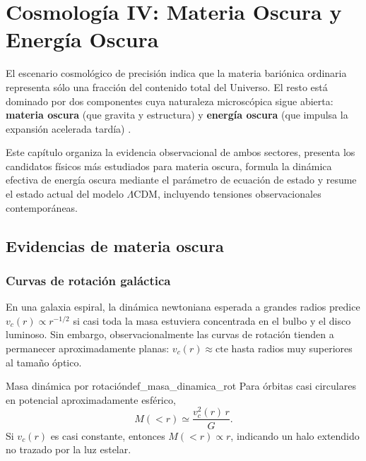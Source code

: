 
\chapter{Cosmología IV: Materia Oscura y Energía Oscura}
\label{cap:materia_oscura}

El escenario cosmológico de precisión indica que la materia bariónica ordinaria representa sólo una fracción del contenido total del Universo. El resto está dominado por dos componentes cuya naturaleza microscópica sigue abierta: \textbf{materia oscura} (que gravita y estructura) y \textbf{energía oscura} (que impulsa la expansión acelerada tardía) \cite{Peebles1993, Dodelson2003, Weinberg2008, Ryden2017, Planck2020}.

Este capítulo organiza la evidencia observacional de ambos sectores, presenta los candidatos físicos más estudiados para materia oscura, formula la dinámica efectiva de energía oscura mediante el parámetro de ecuación de estado y resume el estado actual del modelo $\Lambda$CDM, incluyendo tensiones observacionales contemporáneas.

\section{Evidencias de materia oscura}
\label{sec:evidencias_dm}

\subsection{Curvas de rotación galáctica}

En una galaxia espiral, la dinámica newtoniana esperada a grandes radios predice $v_c(r)\propto r^{-1/2}$ si casi toda la masa estuviera concentrada en el bulbo y el disco luminoso. Sin embargo, observacionalmente las curvas de rotación tienden a permanecer aproximadamente planas: $v_c(r)\approx\text{cte}$ hasta radios muy superiores al tamaño óptico.

\begin{definicion}{Masa dinámica por rotación}{def_masa_dinamica_rot}
Para órbitas casi circulares en potencial aproximadamente esférico,
\begin{equation}
  M(<r)\simeq \frac{v_c^2(r)\,r}{G}.
\end{equation}
Si $v_c(r)$ es casi constante, entonces $M(<r)\propto r$, indicando un halo extendido no trazado por la luz estelar.
\end{definicion}

